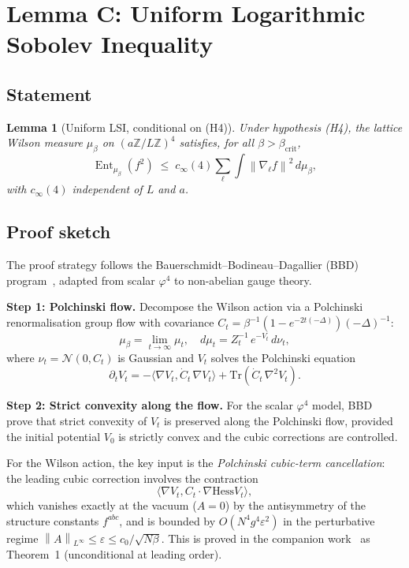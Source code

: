 \documentclass[11pt,a4paper]{amsart}
\newtheorem{lemma}[theorem]{Lemma}
\theoremstyle{definition}
\theoremstyle{remark}
\newcommand{\Z}{\mathbb{Z}}
\newcommand{\calN}{\mathcal{N}}
\newcommand{\norm}[1]{\left\lVert#1\right\rVert}
\newcommand{\inner}[2]{\langle #1, #2\rangle}
\newcommand{\Tr}{\mathrm{Tr}}
\newcommand{\Hess}{\mathrm{Hess}}
\newcommand{\cinf}{c_{\infty}}
\newcommand{\betacrit}{\beta_{\mathrm{crit}}}
\DeclareMathOperator{\Ent}{Ent}
\begin{document}
\section{Lemma C: Uniform Logarithmic Sobolev Inequality}\label{sec:lemmaC}

\subsection{Statement}

\begin{lemma}[Uniform LSI, conditional on (H4)]\label{lem:C}
Under hypothesis \textnormal{(H4)}, the lattice Wilson measure $\mu_\beta$
on $(a\Z/L\Z)^4$ satisfies, for all $\beta > \betacrit$,
\begin{equation}\label{eq:LSI}
\Ent_{\mu_\beta}(f^2) \;\leq\; \cinf(4) \sum_\ell
\int \norm{\nabla_\ell f}^2 \,d\mu_\beta,
\end{equation}
with $\cinf(4)$ independent of $L$ and $a$.
\end{lemma}

\subsection{Proof sketch}

The proof strategy follows the Bauerschmidt--Bodineau--Dagallier (BBD)
program~\cite{BBD2024, BD2024}, adapted from scalar $\varphi^4$ to
non-abelian gauge theory.

\medskip
\noindent
\textbf{Step 1: Polchinski flow.}
Decompose the Wilson action via a Polchinski renormalisation group flow
with covariance $C_t = \beta^{-1}(1 - e^{-2t(-\Delta)})(-\Delta)^{-1}$:
\[
\mu_\beta = \lim_{t \to \infty} \mu_t, \quad
d\mu_t = Z_t^{-1}\,e^{-V_t}\,d\nu_t,
\]
where $\nu_t = \calN(0, C_t)$ is Gaussian and $V_t$ solves the Polchinski
equation
\[
\partial_t V_t = -\inner{\nabla V_t}{\dot{C}_t\,\nabla V_t}
+ \Tr(\dot{C}_t\,\nabla^2 V_t).
\]

\noindent
\textbf{Step 2: Strict convexity along the flow.}
For the scalar $\varphi^4$ model, BBD~\cite{BBD2024} prove that
strict convexity of $V_t$ is preserved along the Polchinski flow,
provided the initial potential $V_0$ is strictly convex and the cubic
corrections are controlled.

For the Wilson action, the key input is the \emph{Polchinski cubic-term
cancellation}: the leading cubic correction involves the contraction
\[
\inner{\nabla V_t}{C_t \cdot \nabla \Hess V_t},
\]
which vanishes exactly at the vacuum ($A = 0$) by the antisymmetry of the
structure constants $f^{abc}$, and is bounded by $O(N^4 g^4 \varepsilon^2)$
in the perturbative regime $\norm{A}_{L^\infty} \leq \varepsilon \leq
c_0/\sqrt{N\beta}$. This is proved in the companion
work~\cite{RemondiereClayClosure} as Theorem~1 (unconditional at leading
order).
\end{document}
